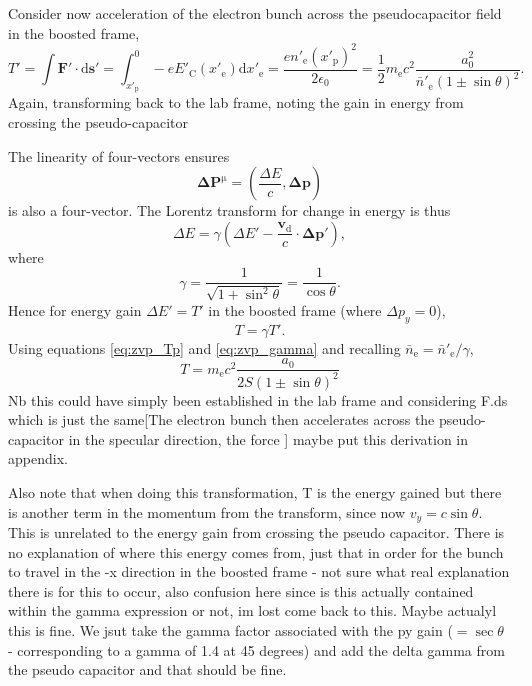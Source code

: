 Consider now acceleration of the electron bunch across the pseudocapacitor field in the boosted frame,
\begin{equation}\label{eq:zvp_Tp}
	T' = \int \mathbf{F}'\cdot \mathrm{d} \mathbf{s}' = \int^0_{x'_\mathrm{p}} -eE'_\mathrm{C}(x'_\mathrm{e}) \mathrm{d}x'_\mathrm{e} =  \frac{en'_\mathrm{e}(x'_\mathrm{p})^2}{2\epsilon_0}=\frac{1}{2}m_\mathrm{e}c^2\frac{a^2_0}{\bar{n}'_\mathrm{e}(1\pm \sin\theta)^2}.
\end{equation}
Again, transforming back to the lab frame, noting the gain in energy from crossing the pseudo-capacitor 


The linearity of four-vectors ensures 
\begin{equation}
	\mathbf{\Delta P}^\mathrm{\mu} = (\frac{\Delta E}{c}, \mathbf{\Delta p})
\end{equation}
is also a four-vector. The Lorentz transform for change in energy is thus
\begin{equation}
	\Delta E = \gamma \left(\Delta E' - \frac{\mathbf{v}_\mathrm{d}}{c}\cdot \mathbf{\Delta p'}\right),
\end{equation}
where 
\begin{equation}\label{eq:zvp_gamma}
	\gamma = \frac{1}{\sqrt{1+\sin^2\theta}} = \frac{1}{\cos\theta}.
\end{equation}
Hence for energy gain $\Delta E' = T'$ in the boosted frame (where $\Delta p_y = 0$),
\begin{equation}
	T = \gamma T'.
\end{equation}
Using equations \ref{eq:zvp_Tp} and \ref{eq:zvp_gamma} and recalling $\bar{n}_\mathrm{e} = \bar{n}'_\mathrm{e}/\gamma$,
\begin{equation}\label{eq:zvp_Tzvp_theta}
	T =m_\mathrm{e}c^2 \frac{a_0}{2S(1\pm\sin\theta)^2}
\end{equation}
Nb this could have simply been established in the lab frame and considering F.ds which is just the same[The electron bunch then accelerates across the pseudo-capacitor in the specular direction, the force ] maybe put this derivation in appendix.

Also note that when doing this transformation, T is the energy gained but there is another term in the momentum from the transform, since now $v_y = c\sin\theta$. This is unrelated to the energy gain from crossing the pseudo capacitor. There is no explanation of where this energy comes from, just that in order for the bunch to travel in the -x direction in the boosted frame - not sure what real explanation there is for this to occur, also confusion here since is this actually contained within the gamma expression or not, im lost come back to this. Maybe actualyl this is fine. We jsut take the gamma factor associated with the py gain ($=\sec\theta$ - corresponding to a gamma of 1.4 at 45 degrees) and add the delta gamma from the pseudo capacitor and that should be fine.

